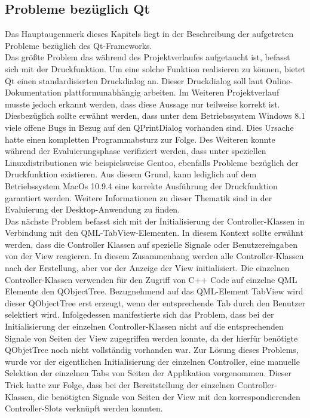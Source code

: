 \subsection{Probleme bezüglich Qt} \label{sec:Probleme bezüglich QT}

Das Hauptaugenmerk dieses Kapitels liegt in der Beschreibung der aufgetreten Probleme bezüglich des Qt-Frameworks. \\
Das größte Problem das während des Projektverlaufes aufgetaucht ist, befasst sich mit der Druckfunktion. Um eine solche Funktion realisieren zu können, bietet Qt einen standardisierten Druckdialog an. Dieser Druckdialog soll laut Online-Dokumentation plattformunabhängig arbeiten. Im Weiteren Projektverlauf musste jedoch erkannt werden, dass diese Aussage nur teilweise korrekt ist. Diesbezüglich sollte erwähnt werden, dass unter dem Betriebssystem Windows 8.1 viele offene Bugs in Bezug auf den QPrintDialog vorhanden sind. Dies Ursache hatte einen kompletten Programmabsturz zur Folge. Des Weiteren konnte während der Evaluierungsphase verifiziert werden, dass unter speziellen Linuxdistributionen wie beispielsweise Gentoo, ebenfalls Probleme bezüglich der Druckfunktion existieren. Aus diesem Grund, kann lediglich auf dem Betriebssystem MacOs 10.9.4 eine korrekte Ausführung der Druckfunktion garantiert werden. Weitere Informationen zu dieser Thematik sind in der Evaluierung der Desktop-Anwendung zu finden. \\
Das nächste Problem befasst sich mit der Initialisierung der Controller-Klassen in Verbindung mit den QML-TabView-Elementen. In diesem Kontext sollte erwähnt werden, dass die Controller Klassen auf spezielle Signale oder Benutzereingaben von der View reagieren. In diesem Zusammenhang werden alle Controller-Klassen nach der Erstellung, aber vor der Anzeige der View initialisiert. Die einzelnen Controller-Klassen verwenden für den Zugriff von C++ Code auf einzelne QML Elemente den QObjectTree. Bezugnehmend auf das QML-Element TabView wird dieser QObjectTree erst erzeugt, wenn der entsprechende Tab durch den Benutzer selektiert wird. Infolgedessen manifestierte sich das Problem, dass bei der Initialisierung der einzelnen Controller-Klassen nicht auf die entsprechenden Signale von Seiten der View zugegriffen werden konnte, da der hierfür benötigte QObjetTree noch nicht vollständig vorhanden war. Zur Lösung dieses Problems, wurde vor der eigentlichen Initialisierung der einzelnen Controller, eine manuelle Selektion der einzelnen Tabs von Seiten der Applikation vorgenommen. Dieser Trick hatte zur Folge, dass bei der Bereitstellung der einzelnen Controller-Klassen, die benötigten Signale von Seiten der View mit den korrespondierenden Controller-Slots verknüpft werden konnten.
